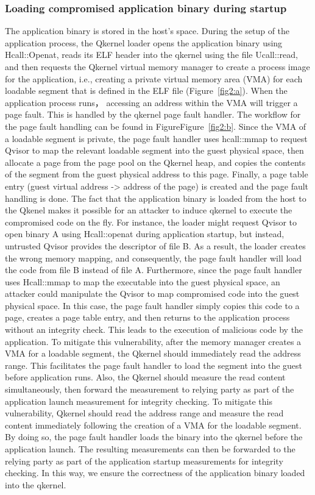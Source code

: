\subsubsection{Loading compromised application binary during startup}
\label{sec:app_binary_loading}
The application binary is stored in the host's space. During the setup of the application process, the Qkernel loader opens the application binary using Hcall::Openat, reads its ELF header 
into the qkernel using the file Ucall::read, and then requests the Qkernel virtual memory manager to create a process image for the application, i.e., creating a private virtual memory area (VMA) for each loadable segment that is defined in the 
ELF file (Figure~\ref{fig2:a}). When the application process runs， accessing an address within the VMA will trigger a page fault. This is handled by the qkernel page fault handler. The workflow for the page fault handling can be found in FigureFigure~\ref{fig2:b}. Since the VMA of 
a loadable segment is private, the page fault handler uses hcall::mmap to request Qvisor to map the relevant loadable segment into the guest physical space, then allocate a page from the page pool on the Qkernel heap, and copies the contents of 
the segment from the guest physical address to this page. Finally, a page table entry (guest virtual address -> address of the page) is created and the page fault handling is done. The fact that the application binary is loaded from the host to 
the Qkenel makes it possible for an attacker to induce qkernel to execute the compromised code on the fly. For instance, the loader might request Qvisor to open binary A using Hcall::openat during application startup, but instead, untrusted Qvisor 
provides the descriptor of file B. As a result, the loader creates the wrong memory mapping, and consequently, the page fault handler will load the code from file B instead of file A. Furthermore, since the page fault handler uses Hcall::mmap to 
map the executable into the guest physical space, an attacker could manipulate the Qvisor to map compromised code into the guest physical space. In this case, the page fault handler simply copies this code to a page, creates a page table entry, 
and then returns to the application process without an integrity check. This leads to the execution of malicious code by the application. To mitigate this vulnerability, after the memory manager creates a VMA for a loadable segment, the Qkernel 
should immediately read the address range. This facilitates the page fault handler to load the segment into the guest before application runs. Also, the Qkernel should measure the read content simultaneously, then forward the measurement to relying 
party as part of the application launch measurement for integrity checking. To mitigate this vulnerability, Qkernel should read the address range and measure the read content immediately following the creation of a VMA for the loadable segment. 
By doing so, the page fault handler loads the binary into the qkernel before the application launch. The resulting measurements can then be forwarded to the relying party as part of the application startup measurements for integrity checking. 
In this way, we ensure the correctness of the application binary loaded into the qkernel.

